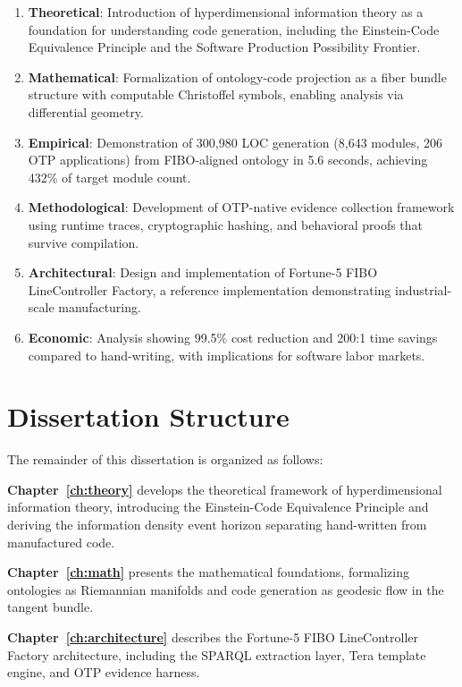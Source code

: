 \begin{enumerate}
    \item \textbf{Theoretical}: Introduction of hyperdimensional information theory as a foundation for understanding code generation, including the Einstein-Code Equivalence Principle and the Software Production Possibility Frontier.

    \item \textbf{Mathematical}: Formalization of ontology-code projection as a fiber bundle structure with computable Christoffel symbols, enabling analysis via differential geometry.

    \item \textbf{Empirical}: Demonstration of 300,980 LOC generation (8,643 modules, 206 OTP applications) from FIBO-aligned ontology in 5.6 seconds, achieving 432\% of target module count.

    \item \textbf{Methodological}: Development of OTP-native evidence collection framework using runtime traces, cryptographic hashing, and behavioral proofs that survive compilation.

    \item \textbf{Architectural}: Design and implementation of Fortune-5 FIBO LineController Factory, a reference implementation demonstrating industrial-scale manufacturing.

    \item \textbf{Economic}: Analysis showing 99.5\% cost reduction and 200:1 time savings compared to hand-writing, with implications for software labor markets.
\end{enumerate}

\section{Dissertation Structure}

The remainder of this dissertation is organized as follows:

\textbf{Chapter~\ref{ch:theory}} develops the theoretical framework of hyperdimensional information theory, introducing the Einstein-Code Equivalence Principle and deriving the information density event horizon separating hand-written from manufactured code.

\textbf{Chapter~\ref{ch:math}} presents the mathematical foundations, formalizing ontologies as Riemannian manifolds and code generation as geodesic flow in the tangent bundle.

\textbf{Chapter~\ref{ch:architecture}} describes the Fortune-5 FIBO LineController Factory architecture, including the SPARQL extraction layer, Tera template engine, and OTP evidence harness.

